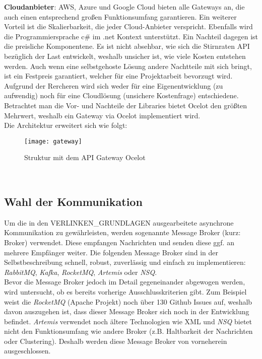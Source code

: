 {\textbf{Cloudanbieter}: AWS, Azure und Google Cloud bieten alle Gateways an, die auch einen entsprechend großen Funktionsumfang garantieren. Ein weiterer Vorteil ist die Skalierbarkeit, die jeder Cloud-Anbieter verspricht. Ebenfalls wird die Programmiersprache c\# im .net Kontext unterstützt.\cite{GoogleCloudEndpointsDotNet}\cite{AWSDotNet} Ein Nachteil dagegen ist die preisliche Komponentene. Es ist nicht absehbar, wie sich die Stirnraten API bezüglich der Last entwickelt, weshalb unsicher ist, wie viele Kosten entstehen werden. Auch wenn eine selbstgehoste Lösung andere Nachtteile mit sich bringt, ist ein Festpreis garantiert, welcher für eine Projektarbeit bevorzugt wird. \\

Aufgrund der Rercheren wird sich weder für eine Eigenentwicklung (zu aufwendig) noch für eine Cloudlösung (unsichere Kostenfrage) entschiedene. Betrachtet man die Vor- und Nachteile der Libraries bietet Ocelot den größten Mehrwert, weshalb ein Gateway via Ocelot implementiert wird.\\

Die Architektur erweitert sich wie folgt: 
\begin{figure}[ht]
	\centering
	\texttt{[image: gateway]}
	\caption[API Gateway mit Ocelot] {Struktur mit dem API Gateway Ocelot}
	\label{fig:gateway}
\end{figure}
\\

\subsection{Wahl der Kommunikation}

Um die in den VERLINKEN\_GRUNDLAGEN ausgearbeitete asynchrone Kommunikation zu gewährleisten, werden sogenannte Message Broker (kurz: Broker) verwendet. Diese empfangen Nachrichten und senden diese ggf. an mehrere Empfänger weiter. Die folgenden Message Broker sind in der Selbstbeschreibung schnell, robust, zuverlässig und einfach zu implementieren: \textit{RabbitMQ}, \textit{Kafka}, \textit{RocketMQ}, \textit{Artemis} oder \textit{NSQ}.\\

Bevor die Message Broker jedoch im Detail gegeneinander abgewogen werden, wird untersucht, ob es bereits vorherige Ausschlusskriterien gibt. Zum Beispiel weist die \textit{RocketMQ} (Apache Projekt) noch über 130 Github Issues auf, weshalb davon auszugehen ist, dass dieser Message Broker sich noch in der Entwicklung befindet. \textit{Artemis} verwendet noch ältere Technologien wie XML und \textit{NSQ} bietet nicht den Funktionsumfang wie andere Broker (z.B. Haltbarkeit der Nachrichten oder Clustering).\cite{messageQueue2018} Deshalb werden diese Message Broker von vorneherein ausgeschlossen. \\ %

}
